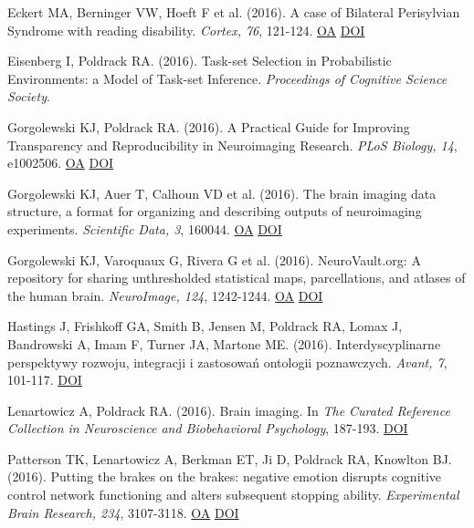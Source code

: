 \documentclass[10pt, letterpaper]{article}
\begin{document}
Eckert MA, Berninger VW, Hoeft F et al. (2016). A case of Bilateral Perisylvian Syndrome with reading disability. \textit{Cortex, 76}, 121-124. \href{https://www.ncbi.nlm.nih.gov/pmc/articles/PMC4776332}{OA} \href{https://doi.org/10.1016/j.cortex.2016.01.004}{DOI} \vspace{2mm}

Eisenberg I, Poldrack RA.  (2016). Task-set Selection in Probabilistic Environments: a Model of Task-set Inference. \textit{Proceedings of Cognitive Science Society}. \vspace{2mm}

Gorgolewski KJ, Poldrack RA.  (2016). A Practical Guide for Improving Transparency and Reproducibility in Neuroimaging Research. \textit{PLoS Biology, 14}, e1002506. \href{https://www.ncbi.nlm.nih.gov/pmc/articles/PMC4936733}{OA} \href{https://doi.org/10.1371/journal.pbio.1002506}{DOI} \vspace{2mm}

Gorgolewski KJ, Auer T, Calhoun VD et al. (2016). The brain imaging data structure, a format for organizing and describing outputs of neuroimaging experiments. \textit{Scientific Data, 3}, 160044. \href{https://www.ncbi.nlm.nih.gov/pmc/articles/PMC4978148}{OA} \href{https://doi.org/10.1038/sdata.2016.44}{DOI} \vspace{2mm}

Gorgolewski KJ, Varoquaux G, Rivera G et al. (2016). NeuroVault.org: A repository for sharing unthresholded statistical maps, parcellations, and atlases of the human brain. \textit{NeuroImage, 124}, 1242-1244. \href{https://www.ncbi.nlm.nih.gov/pmc/articles/PMC4806527}{OA} \href{https://doi.org/10.1016/j.neuroimage.2015.04.016}{DOI} \vspace{2mm}

Hastings J, Frishkoff GA, Smith B, Jensen M, Poldrack RA, Lomax J, Bandrowski A, Imam F, Turner JA, Martone ME.  (2016). Interdyscyplinarne perspektywy rozwoju, integracji i zastosowań ontologii poznawczych. \textit{Avant, 7}, 101-117. \href{https://doi.org/10.26913/70302016.0109.0007}{DOI} \vspace{2mm}

Lenartowicz A, Poldrack RA.  (2016). Brain imaging. In \textit{The Curated Reference Collection in Neuroscience and Biobehavioral Psychology}, 187-193. \href{https://doi.org/10.1016/b978-0-12-809324-5.00274-1}{DOI} \vspace{2mm}

Patterson TK, Lenartowicz A, Berkman ET, Ji D, Poldrack RA, Knowlton BJ.  (2016). Putting the brakes on the brakes: negative emotion disrupts cognitive control network functioning and alters subsequent stopping ability. \textit{Experimental Brain Research, 234}, 3107-3118. \href{https://www.ncbi.nlm.nih.gov/pmc/articles/PMC5073018}{OA} \href{https://doi.org/10.1007/s00221-016-4709-2}{DOI} \vspace{2mm}
\end{document}
